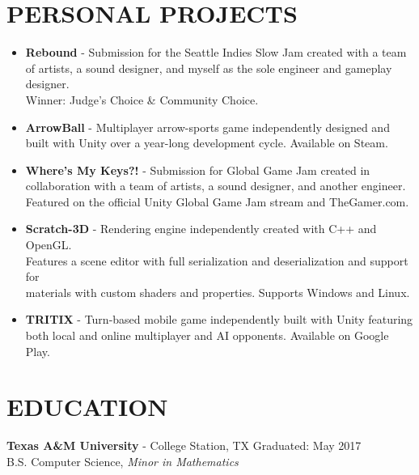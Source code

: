 \documentclass[resmargin,10pt]{res} %
\begin{document}
\begin{resume}
\section{PERSONAL PROJECTS}
				\begin{itemize}    
								\item \textbf{Rebound} - Submission for the Seattle Indies Slow Jam created with a team of artists, a sound designer, and myself as the sole engineer and gameplay designer. \\ Winner: Judge's Choice \& Community Choice.   
				\item \textbf{ArrowBall} - Multiplayer arrow-sports game independently designed and built with Unity over a year-long development cycle. Available on Steam.
				\item \textbf{Where's My Keys?!} - Submission for Global Game Jam created in collaboration with a team of artists, a sound designer, and another engineer. Featured on the official Unity Global Game Jam stream and TheGamer.com.
				                	\item \textbf{Scratch-3D} - Rendering engine independently created with C++ and OpenGL. \\Features a scene editor with full serialization and deserialization and support for \\materials with custom shaders and properties. Supports Windows and Linux.
                	\item \textbf{TRITIX} - Turn-based mobile game independently built with Unity featuring both local and online multiplayer and AI opponents. Available on Google Play.
                \end{itemize}
                
\section{EDUCATION}
{\bf Texas A\&M University} - College Station, TX \hfill
Graduated: May 2017 \\
B.S. Computer Science,
\textit{Minor in Mathematics}
\end{resume} 
\end{document}

